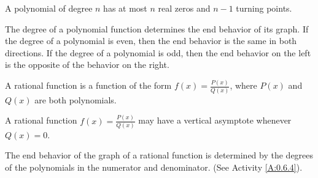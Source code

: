 \begin{summary}
	\item A polynomial of degree $n$ has at most $n$ real zeros and $n-1$ turning points.
	\item The degree of a polynomial function determines the end behavior of its graph.  If the degree of a polynomial is even, then the end behavior is the same in both directions.  If the degree of a polynomial is odd, then the end behavior on the left is the opposite of the behavior on the right.
	\item A rational function is a function of the form $f(x)=\frac{P(x)}{Q(x)}$, where $P(x)$ and $Q(x)$ are both polynomials.
	\item A rational function $f(x)=\frac{P(x)}{Q(x)}$ may have a vertical asymptote whenever $Q(x)=0$.
	\item The end behavior of the graph of a rational function is determined by the degrees of the polynomials in the numerator and denominator. (See Activity \ref{A:0.6.4}).
\end{summary}



\clearpage
